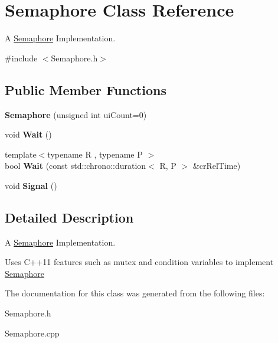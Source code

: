 \hypertarget{classSemaphore}{}\section{Semaphore Class Reference}
\label{classSemaphore}


A \hyperlink{classSemaphore}{Semaphore} Implementation.  




{\ttfamily \#include $<$Semaphore.\+h$>$}

\subsection*{Public Member Functions}
\begin{DoxyCompactItemize}
\item 
{\bfseries Semaphore} (unsigned int ui\+Count=0)\hypertarget{classSemaphore_a0d9290d316636875ca85d1d78950a817}{}\label{classSemaphore_a0d9290d316636875ca85d1d78950a817}

\item 
void {\bfseries Wait} ()\hypertarget{classSemaphore_a72aabebf026e3a8b1f3e4d0fa8ee1eda}{}\label{classSemaphore_a72aabebf026e3a8b1f3e4d0fa8ee1eda}

\item 
{\footnotesize template$<$typename R , typename P $>$ }\\bool {\bfseries Wait} (const std\+::chrono\+::duration$<$ R, P $>$ \&cr\+Rel\+Time)\hypertarget{classSemaphore_a7f700173ae86ae623684109066e07656}{}\label{classSemaphore_a7f700173ae86ae623684109066e07656}

\item 
void {\bfseries Signal} ()\hypertarget{classSemaphore_a86f92f738b4486439b296d8e235895f2}{}\label{classSemaphore_a86f92f738b4486439b296d8e235895f2}

\end{DoxyCompactItemize}


\subsection{Detailed Description}
A \hyperlink{classSemaphore}{Semaphore} Implementation. 

Uses C++11 features such as mutex and condition variables to implement \hyperlink{classSemaphore}{Semaphore} 

The documentation for this class was generated from the following files\+:\begin{DoxyCompactItemize}
\item 
Semaphore.\+h\item 
Semaphore.\+cpp\end{DoxyCompactItemize}
